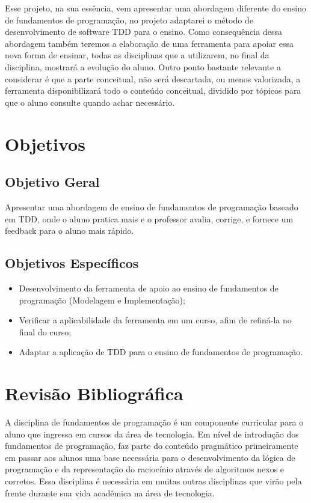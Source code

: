 \documentclass[pnumabnt,normaltoc,espacoumemeio,capchap]{abnt}
\begin{document}
\par Esse projeto, na sua essência, vem apresentar uma abordagem diferente do ensino de fundamentos de programação, no projeto adaptarei o método de desenvolvimento de software TDD para o ensino. Como consequência dessa abordagem também teremos a elaboração de uma ferramenta para apoiar essa nova forma de ensinar, todas as disciplinas que a utilizarem, no final da disciplina, mostrará a evolução do aluno. Outro ponto bastante relevante a considerar é que a parte conceitual, não será descartada, ou menos valorizada, a ferramenta disponibilizará todo o conteúdo conceitual, dividido por tópicos para que o aluno consulte quando achar necessário.

\chapter{Objetivos}
\section{Objetivo Geral}
\par Apresentar uma abordagem de ensino de fundamentos de programação baseado em TDD, onde o aluno pratica mais e o professor avalia, corrige, e fornece um feedback para o aluno mais rápido.

\section{Objetivos Específicos}
\begin{itemize}
	\item Desenvolvimento da ferramenta de apoio ao ensino de fundamentos de programação (Modelagem e Implementação);
	\item Verificar a aplicabilidade da ferramenta em um curso, afim de refiná-la no final do curso;
	\item Adaptar a aplicação de TDD para o ensino de fundamentos de programação.
\end{itemize}

\chapter{Revisão Bibliográfica}
\par A disciplina de fundamentos de programação é um componente curricular para o aluno que ingressa em cursos da área de tecnologia. Em nível de introdução dos fundamentos de programação, faz parte do conteúdo pragmático primeiramente em passar aos alunos uma base necessária para o desenvolvimento da lógica de programação e da representação do raciocínio através de algoritmos nexos e corretos. Essa disciplina é necessária em muitas outras disciplinas que virão pela frente durante sua vida acadêmica na área de tecnologia.
\end{document}
